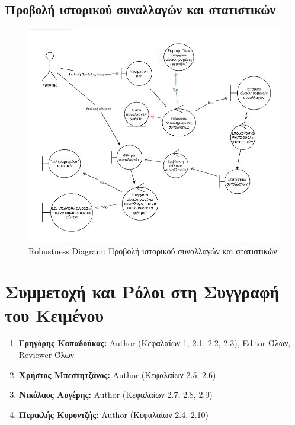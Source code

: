 \documentclass[12pt,a4paper]{article}
\begin{document}
\subsection{Προβολή ιστορικού συναλλαγών και στατιστικών}
\begin{figure}[H]
	\includegraphics[width=\textwidth]{History and Statistics Robustness.png}
	\caption{Robustness Diagram: Προβολή ιστορικού συναλλαγών και στατιστικών}
	\label{Robustness Diagram: Προβολή ιστορικού συναλλαγών και στατιστικών}
\end{figure}

\section{Συμμετοχή και Ρόλοι στη Συγγραφή του Κειμένου}
\begin{enumerate}
	\item \textbf{Γρηγόρης Καπαδούκας:} Author (Κεφαλαίων 1, 2.1, 2.2, 2.3), Editor Όλων, Reviewer Όλων
	\item \textbf{Χρήστος Μπεστητζάνος:} Author (Κεφαλαίων 2.5, 2.6)
   	\item \textbf{Νικόλαος Αυγέρης:} Author (Κεφαλαίων 2.7, 2.8, 2.9)
	\item \textbf{Περικλής Κοροντζής:} Author (Κεφαλαίων 2.4, 2.10)
\end{enumerate}
\end{document}
